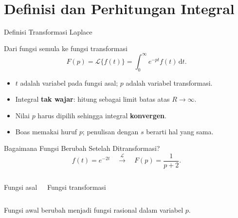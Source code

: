 \documentclass[aspectratio=169,11pt]{beamer}
\newcommand{\Lap}{\mathcal{L}}
\newcommand{\dd}{\,\mathrm{d}}
\begin{document}
\section{Definisi dan Perhitungan Integral}
\begin{frame}{Definisi Transformasi Laplace}
\begin{block}{Dari fungsi semula ke fungsi transformasi}
\[
\boxed{F(p)=\Lap\{f(t)\}=\int_0^\infty e^{-pt}f(t)\dd t.}
\]
\end{block}
\begin{itemize}
\item $t$ adalah variabel pada fungsi asal; $p$ adalah variabel transformasi.
\item Integral \textbf{tak wajar}: hitung sebagai limit batas atas $R\to\infty$.
\item Nilai $p$ harus dipilih sehingga integral \textbf{konvergen}.
\item Boas memakai huruf $p$; penulisan dengan $s$ berarti hal yang sama.
\end{itemize}
\end{frame}

\begin{frame}{Bagaimana Fungsi Berubah Setelah Ditransformasi?}
\[
\boxed{f(t)=e^{-2t}}\quad\xrightarrow{\ \Lap\ }\quad
\boxed{F(p)=\frac{1}{p+2}.}
\]
\begin{columns}[T]
\begin{block}{Fungsi asal}
\centering
{}
\end{block}
\begin{block}{Fungsi transformasi}
\centering
{}
\end{block}
\end{columns}
\vspace{3mm}\centering\scriptsize Fungsi awal berubah menjadi fungsi rasional dalam variabel $p$.
\end{frame}
\end{document}
